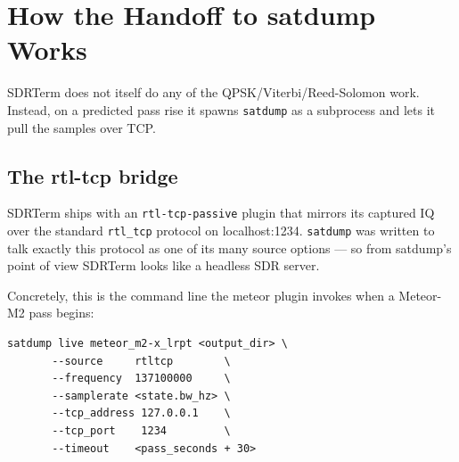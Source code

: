 \documentclass[11pt,a4paper]{article}
\begin{document}
\section{How the Handoff to satdump Works}

SDRTerm does not itself do any of the QPSK/Viterbi/Reed-Solomon work.
Instead, on a predicted pass rise it spawns \texttt{satdump} as a
subprocess and lets it pull the samples over TCP.

\subsection{The rtl-tcp bridge}

SDRTerm ships with an \texttt{rtl-tcp-passive} plugin that mirrors
its captured IQ over the standard \texttt{rtl\_tcp} protocol on
localhost:1234.  \texttt{satdump} was written to talk exactly this
protocol as one of its many source options — so from satdump's point
of view SDRTerm looks like a headless SDR server.

\begin{center}
\end{center}

Concretely, this is the command line the meteor plugin invokes when
a Meteor-M2 pass begins:

\begin{lstlisting}
satdump live meteor_m2-x_lrpt <output_dir> \
       --source     rtltcp        \
       --frequency  137100000     \
       --samplerate <state.bw_hz> \
       --tcp_address 127.0.0.1    \
       --tcp_port    1234         \
       --timeout    <pass_seconds + 30>
\end{lstlisting}
\end{document}
